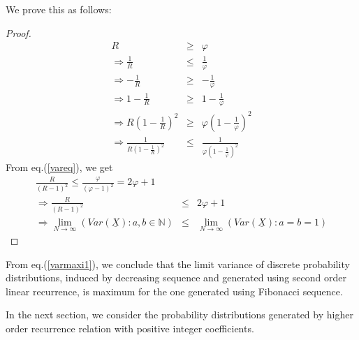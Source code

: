 \begin{multicols}{2}
We prove this as follows:
\begin{proof}\renewcommand{\qedsymbol}{} 
\begin{eqnarray}
 R &\ge& \varphi\nonumber\\
 \Rightarrow \frac{1}{R} &\le& \frac{1}{\varphi}\nonumber\\
\Rightarrow -\frac{1}{R} &\ge& - \frac{1}{\varphi}\nonumber\\
\Rightarrow 1-\frac{1}{R} &\ge& 1 - \frac{1}{\varphi}\nonumber\\
\Rightarrow R\left(1-\frac{1}{R}\right)^2 &\ge& \varphi\left(1 - \frac{1}{\varphi}\right)^2\nonumber\\
\Rightarrow \frac{1}{R\left(1-\frac{1}{R}\right)^2} &\le& \frac{1}{\varphi\left(1 - \frac{1}{\varphi}\right)^2}\label{eq-10.6}
\end{eqnarray}
From eq.(\ref{vareq}), we get 
{\fontsize{7}{8}\selectfont\begin{eqnarray}
\frac{R}{(R-1)^2} \le \frac{\varphi}{(\varphi-1)^2} = 2\varphi + 1\nonumber\\
\Rightarrow \frac{R}{(R-1)^2} &\le& 2\varphi + 1\\\label{eq-10.7}
\Rightarrow \label{varmaxi1}\lim_{N\rightarrow \infty} \left(Var(\underline{X}):a,b\in \mathbb N\right) &\leq& \lim_{N\rightarrow \infty}\left(Var(\underline{X}): a = b = 1\right)\label{eq-10.8}
\end{eqnarray}}
\end{proof}
From eq.(\ref{varmaxi1}), we conclude that the limit variance of discrete probability distributions, induced by decreasing sequence and generated using second order linear recurrence, is maximum for the one generated using Fibonacci sequence.

In the next section, we consider the probability distributions generated by higher order recurrence relation with positive integer coefficients.


\end{multicols}
